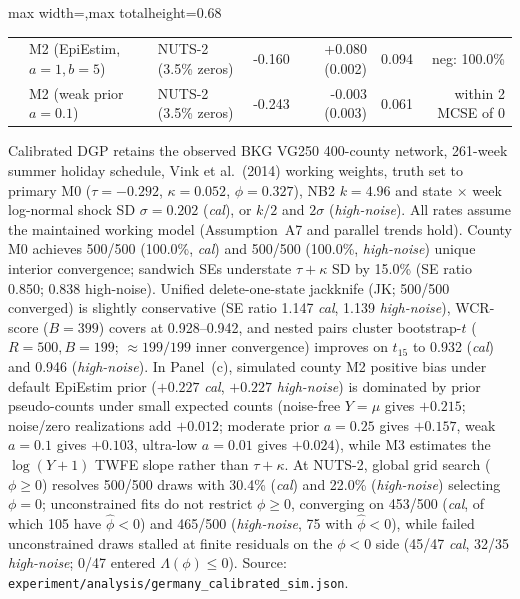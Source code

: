 \begin{table}[!t]
\begin{adjustbox}{max width=\linewidth,max totalheight=0.68\textheight}
\begin{tabular}{llrrrrrrrrrr}
 & M2 (EpiEstim, $a=1,b=5$) & \multicolumn{2}{l}{NUTS-2 (3.5\% zeros)} & -0.160 & +0.080 (0.002) & 0.094 & \multicolumn{5}{r}{neg: 100.0\%} \\
 & M2 (weak prior $a=0.1$) & \multicolumn{2}{l}{NUTS-2 (3.5\% zeros)} & -0.243 & -0.003 (0.003) & 0.061 & \multicolumn{5}{r}{within 2 MCSE of 0} \\
\bottomrule
\end{tabular}
\end{adjustbox}
\par\smallskip\parbox{\linewidth}{\tiny Calibrated DGP retains the observed BKG VG250 400-county network, 261-week summer holiday schedule, Vink et al.\ (2014) working weights, truth set to primary M0 ($\tau=-0.292$, $\kappa=0.052$, $\phi=0.327$), NB2 $k=4.96$ and state $\times$ week log-normal shock SD $\sigma=0.202$ (\emph{cal}), or $k/2$ and $2\sigma$ (\emph{high-noise}). All rates assume the maintained working model (Assumption~A7 and parallel trends hold). County M0 achieves 500/500 (100.0\%, \emph{cal}) and 500/500 (100.0\%, \emph{high-noise}) unique interior convergence; sandwich SEs understate $\tau+\kappa$ SD by 15.0\% (SE ratio 0.850; 0.838 high-noise). Unified delete-one-state jackknife (JK; 500/500 converged) is slightly conservative (SE ratio 1.147 \emph{cal}, 1.139 \emph{high-noise}), WCR-score ($B=399$) covers at 0.928--0.942, and nested pairs cluster bootstrap-$t$ ($R=500, B=199$; $\approx 199/199$ inner convergence) improves on $t_{15}$ to 0.932 (\emph{cal}) and 0.946 (\emph{high-noise}). In Panel~(c), simulated county M2 positive bias under default EpiEstim prior ($+0.227$ \emph{cal}, $+0.227$ \emph{high-noise}) is dominated by prior pseudo-counts under small expected counts (noise-free $Y=\mu$ gives $+0.215$; noise/zero realizations add $+0.012$; moderate prior $a=0.25$ gives $+0.157$, weak $a=0.1$ gives $+0.103$, ultra-low $a=0.01$ gives $+0.024$), while M3 estimates the $\log(Y+1)$ TWFE slope rather than $\tau+\kappa$. At NUTS-2, global grid search ($\phi\ge 0$) resolves 500/500 draws with 30.4\% (\emph{cal}) and 22.0\% (\emph{high-noise}) selecting $\phi=0$; unconstrained fits do not restrict $\phi\ge 0$, converging on 453/500 (\emph{cal}, of which 105 have $\hat\phi<0$) and 465/500 (\emph{high-noise}, 75 with $\hat\phi<0$), while failed unconstrained draws stalled at finite residuals on the $\phi<0$ side (45/47 \emph{cal}, 32/35 \emph{high-noise}; 0/47 entered $\Lambda(\phi)\le 0$). Source: \texttt{experiment/analysis/germany\_calibrated\_sim.json}.}
\end{table}
